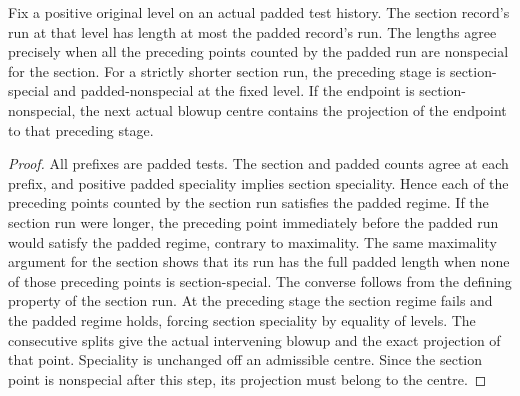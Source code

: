 \begin{theorem}
\label{hir:g1-positive-normal-section-run}
\leanok
Fix a positive original level on an actual padded test history. The
section record's run at that level has length at most the padded
record's run. The lengths agree precisely when all the preceding
points counted by the padded run are nonspecial for the section.
For a strictly shorter section run, the preceding stage is
section-special and padded-nonspecial at the fixed level. If the
endpoint is section-nonspecial, the next actual blowup centre
contains the projection of the endpoint to that preceding stage.
\end{theorem}
\begin{proof}
All prefixes are padded tests. The section and padded counts agree at
each prefix, and positive padded speciality implies section
speciality. Hence each of the preceding points counted by the section
run satisfies the padded regime. If the section run were longer, the
preceding point immediately before the padded run would satisfy the
padded regime, contrary to maximality. The same maximality argument
for the section shows that its run has the full padded length when
none of those preceding points is section-special. The converse
follows from the defining property of the section run.
At the preceding stage the section regime fails and the padded
regime holds, forcing section speciality by equality of levels.
The consecutive splits give the actual intervening blowup and
the exact projection of that point. Speciality is unchanged
off an admissible centre. Since the section point is nonspecial
after this step, its projection must belong to the centre.
\end{proof}

